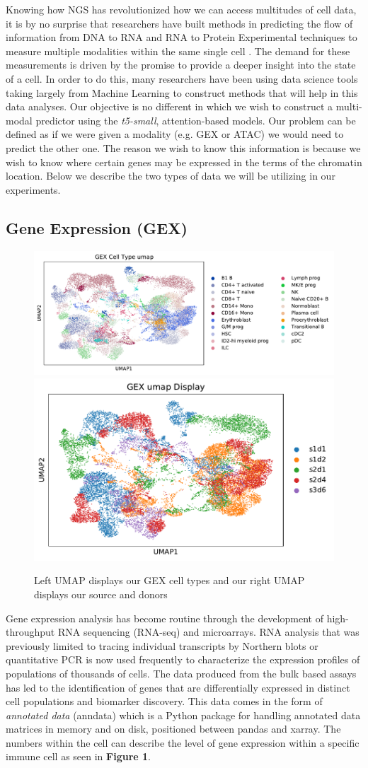 Knowing how NGS has revolutionized how we can access multitudes of cell data, it is by no surprise that researchers have built methods in predicting the flow of information from DNA to RNA and RNA to Protein Experimental techniques to measure multiple modalities within the same single cell \cite{five}. 
The demand for these measurements is driven by the promise to provide a deeper insight into the state of a cell. 
In order to do this, many researchers have been using data science tools taking largely from Machine Learning to construct methods that will help in this data analyses.
Our objective is no different in which we wish to construct a multi-modal predictor using the \emph{t5-small}, attention-based models. 
Our problem can be defined as if we were given a modality (e.g. GEX or ATAC) we would need to predict the other one.
The reason we wish to know this information is because we wish to know where certain genes may be expressed in the terms of the chromatin location.
Below we describe the two types of data we will be utilizing in our experiments.

\subsection{Gene Expression (GEX)}
\begin{figure}[H]
\centering
\includegraphics[width=.5\textwidth]{figures/umap_GEX_ct.pdf}
\includegraphics[width=.35\textwidth]{figures/umap_GEX.pdf}
\caption{Left UMAP displays our GEX cell types and our right UMAP displays our source and donors}
\end{figure}

Gene expression analysis has become routine through the development of high-throughput RNA sequencing (RNA-seq) and microarrays. 
RNA analysis that was previously limited to tracing individual transcripts by Northern blots or quantitative PCR is now used frequently to characterize the expression profiles of populations of thousands of cells. 
The data produced from the bulk based assays has led to the identification of genes that are differentially expressed in distinct cell populations and biomarker discovery. This data comes in the form of \emph{annotated data} (anndata) which is a Python package for handling annotated data matrices in memory and on disk, positioned between pandas and xarray. The numbers within the cell can describe the level of gene expression within a specific immune cell as seen in \textbf{Figure 1}.

